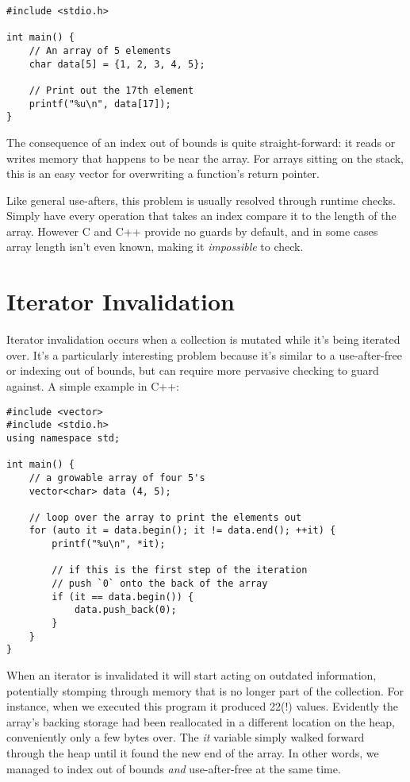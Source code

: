 \begin{verbatim}
#include <stdio.h>

int main() {
    // An array of 5 elements
    char data[5] = {1, 2, 3, 4, 5};

    // Print out the 17th element
    printf("%u\n", data[17]);
}
\end{verbatim}

The consequence of an index out of bounds is quite straight-forward: it reads
or writes memory that happens to be near the array. For arrays sitting on the
stack, this is an easy vector for overwriting a function's return pointer.

Like general use-afters, this problem is usually resolved through runtime
checks. Simply have every operation that takes an index compare it to the length of the
array. However C and C++ provide no guards by default, and in some cases array
length isn't even known, making it \emph{impossible} to check.





\section{Iterator Invalidation}

Iterator invalidation occurs when a collection is mutated while it's being iterated
over. It's a particularly interesting problem because it's similar to a
use-after-free or indexing out of bounds, but can require more pervasive checking
to guard against. A simple example in C++:

\begin{verbatim}
#include <vector>
#include <stdio.h>
using namespace std;

int main() {
    // a growable array of four 5's
    vector<char> data (4, 5);

    // loop over the array to print the elements out
    for (auto it = data.begin(); it != data.end(); ++it) {
        printf("%u\n", *it);

        // if this is the first step of the iteration
        // push `0` onto the back of the array
        if (it == data.begin()) {
            data.push_back(0);
        }
    }
}
\end{verbatim}

When an iterator is invalidated it will start acting on
outdated information, potentially stomping through memory that is no longer
part of the collection. For instance, when we executed this program it produced
22(!) values. Evidently the array's backing storage had been reallocated
in a different location on the heap, conveniently only a few bytes over. The \emph{it}
variable simply walked forward through the heap until it found the new end of
the array. In other words, we managed to index out of bounds \emph{and} use-after-free
at the same time.

